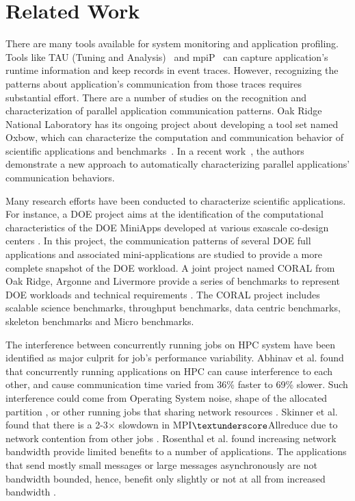 \section{Related Work}
\label{sec:related_work}

There are many tools available for system monitoring and application profiling. 
Tools like TAU (Tuning and Analysis)~\cite{tau} and mpiP~\cite{mpip} can capture 
application's runtime information and keep records in event traces. 
However, recognizing the patterns about application's communication from those traces requires substantial effort. There are a number of studies on the recognition and characterization of parallel application communication patterns. Oak Ridge National Laboratory has its ongoing project about developing a tool set named Oxbow, which can characterize the computation and communication behavior of scientific applications and benchmarks~\cite{oxbow}. In a recent work~\cite{roth}, the authors demonstrate a new approach to automatically characterizing parallel applications' communication behaviors. 


Many research efforts have been conducted to characterize scientific applications. For instance, a DOE project aims at the identification of the computational characteristics of the DOE MiniApps developed at various exascale co-design centers \cite{designforwardwebpage}. In this project, the communication patterns of several DOE full applications and associated mini-applications are studied to provide a more complete snapshot of the DOE workload. A joint project named CORAL from Oak Ridge, Argonne and Livermore provide a series of benchmarks to represent DOE workloads and technical requirements \cite{coral}. The CORAL project includes scalable science benchmarks, throughput benchmarks, data centric benchmarks, skeleton benchmarks and Micro benchmarks.  

The interference between concurrently running jobs on HPC system have been identified as major culprit for job's performance variability. Abhinav et al. found that concurrently running applications on HPC can cause interference to each other, and cause communication time varied from 36\% faster to 69\% slower. Such interference could come from Operating System noise, shape of the allocated partition , or other running jobs that sharing network resources \cite{abhinav-sc13}. Skinner et al. found that  there is a 2-3$\times$ slowdown in MPI$\textunderscore$Allreduce due to network contention from other jobs \cite{skinner}. Rosenthal et al. found increasing network bandwidth provide limited benefits to a number of applications. The applications that send mostly small messages or large messages asynchronously are not bandwidth bounded, hence, benefit only slightly or not at all from increased bandwidth \cite{rosenthal}.

